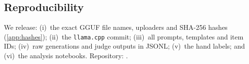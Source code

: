 \subsection{Reproducibility}
We release: (i)~the exact GGUF file names, uploaders and SHA-256 hashes
(\cref{app:hashes}); (ii)~the \texttt{llama.cpp} commit; (iii)~all prompts, templates
and item IDs; (iv)~raw generations and judge outputs in JSONL; (v)~the hand labels;
and (vi)~the analysis notebooks. Repository: .
